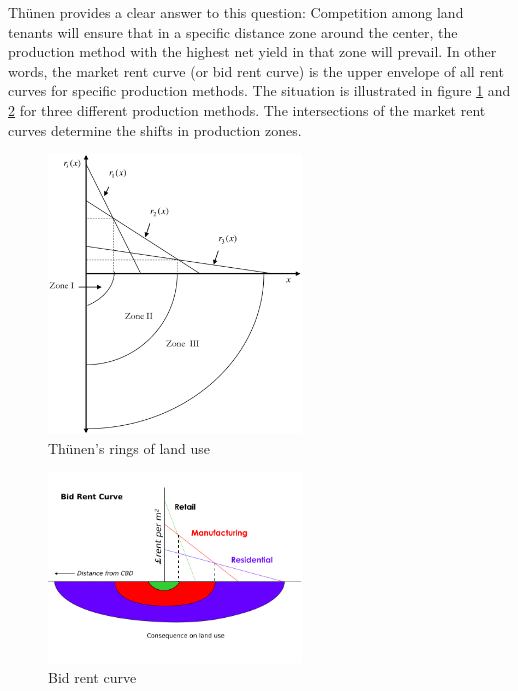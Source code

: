 \documentclass[
  12pt,
  oneside]{book}
\theoremstyle{definition}
\theoremstyle{definition}
\theoremstyle{definition}
\theoremstyle{definition}
\theoremstyle{remark}
\begin{document}
Thünen provides a clear answer to this question: Competition among land tenants will ensure that in a specific distance zone around the center, the production method with the highest net yield in that zone will prevail. In other words, the market rent curve (or bid rent curve) is the upper envelope of all rent curves for specific production methods. The situation is illustrated in figure \ref{fig:thuenen} and \ref{fig:thuenen2} for three different production methods. The intersections of the market rent curves determine the shifts in production zones.

\begin{figure}
\centering
\includegraphics[width=0.6\textwidth,height=\textheight]{fig/thuenen.png}
\caption{\label{fig:thuenen} Thünen's rings of land use}
\end{figure}

\begin{figure}
\centering
\includegraphics[width=0.6\textwidth,height=\textheight]{fig/Bid_rent1.png}
\caption[\label{fig:thuenen2} Bid rent curve]{\label{fig:thuenen2} Bid rent curve\footnotemark{}}
\end{figure}
\end{document}
